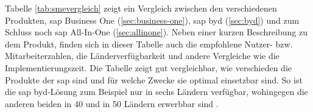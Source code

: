 Tabelle \ref{tab:smevergleich} zeigt ein Vergleich zwischen den verschiedenen Produkten, \gls{sap} Business One (\ref{sec:business-one}), \gls{sap} \gls{byd} (\ref{sec:byd}) und zum Schluss noch \gls{sap} All-In-One (\ref{sec:allinone}). Neben einer kurzen Beschreibung zu dem Produkt, finden sich in dieser Tabelle auch die empfohlene Nutzer- bzw. Mitarbeiterzahlen, die Länderverfügbarkeit und andere Vergleiche wie die Implementierungszeit. Die Tabelle zeigt gut vergleichbar, wie verschieden die Produkte der \gls{sap} sind und für welche Zwecke sie optimal einsetzbar sind. So ist die \gls{sap} \gls{byd}-Lösung zum Beispiel nur in sechs Ländern verfügbar, wohingegen die anderen beiden in 40 und in 50 Ländern erwerbbar sind \cite{SAPin24hrs}.
